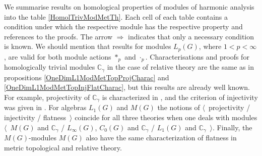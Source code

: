 \documentclass{article}
\theoremstyle{plain}
\theoremstyle{definition}
\newcommand{\convol}{\ast}
\begin{document}
\begin{fulltext}
We summarise results on homological properties of modules of harmonic analysis into the table \ref{HomolTrivModMetTh}. Each cell of each table contains a condition under 
which the respective module has the respective property and references to the proofs. The arrow 
$\Longrightarrow$ indicates that only a necessary condition is known. We 
should mention that results for modules $L_p(G)$, where $1<p<\infty$, are valid for both 
module actions $\convol_p$ and $\cdot_p$. Characterisations and proofs for homologically trivial 
modules $\mathbb{C}_\gamma$ in the case of relative theory are the same as in propositions \ref{OneDimL1ModMetTopProjCharac} and \ref{OneDimL1ModMetTopInjFlatCharac}, but this results 
are already well known. For example, projectivity of $\mathbb{C}_\gamma$ is characterized 
in \cite[theorem IV.5.13]{HelBanLocConvAlg}, and the criterion of injectivity was given 
in \cite[theorem 2.5]{JohnCohomolBanAlg}. For algebras $L_1(G)$ and $M(G)$ the notions of
$\langle$~projectivity / injectivity / flatness~$\rangle$ coincide for all three theories when
one deals with modules $\langle$~$M(G)$ and $\mathbb{C}_\gamma$ / $L_\infty(G)$, $C_0(G)$ and 
$\mathbb{C}_\gamma$ / $L_1(G)$ and $\mathbb{C}_\gamma$~$\rangle$. Finally, the $M(G)$-modules
$M(G)$ also have the same characterization of flatness in metric topological and relative theory.


\end{fulltext}
\end{document}

